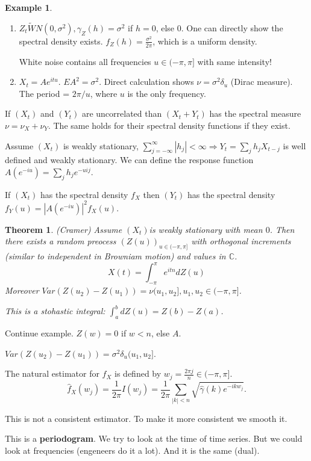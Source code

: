 \documentclass[12pt,a4paper]{amsart}
\theoremstyle{definition} %
\newtheorem{example}[defn]{Example}
\theoremstyle{plain} %
\newtheorem{theorem}[defn]{Theorem}
\newcommand{\C}{\mathbb C}
\begin{document}
\begin{example}
\begin{enumerate}
\item $Z_t \tilde WN(0, \sigma^2), \gamma_Z(h) = \sigma^2$ if $h = 0$, else $0$. One can directly show the spectral density exists. $f_Z(h) = \frac{\sigma^2}{2 \pi}$, which is a uniform density. 

White noise contains all frequencies $u \in (-\pi, \pi]$ with same intensity! 
\item $X_t = A e^{i t u}$. $E A^2 = \sigma^2$. Direct calculation shows $\nu = \sigma^2 \delta_u$ (Dirac measure). The period = $2 \pi / u$, where $u$ is the only frequency. 
\end{enumerate}
\vskip0.5cm

If $(X_t)$ and $(Y_t)$ are uncorrelated than  $(X_t + Y_t)$ has the spectral measure $\nu = \nu_X + \nu_Y$. The same holds for their spectral density functions if they exist. 

Assume $(X_t)$ is weakly stationary, $\sum_{j=-\infty}^\infty |h_j| < \infty \Rightarrow Y_t = \sum_j h_j X_{t-j}$ is well defined and weakly stationary. We can define the response function $A(e^{-iu}) = \sum_j h_j e^{-uij}$.

If $(X_t)$ has the spectral density $f_X$ then $(Y_t)$ has the spectral density $f_Y(u) = |A(e^{-iu})|^2 f_X(u)$. 

\begin{theorem} (Cramer)
Assume $(X_t)$is weakly stationary with mean $0$. Then there exists a random preocess $(Z(u))_{u \in(-\pi, \pi]}$ with orthogonal increments (similar to independent in Browniam motion) and values in $\C$. 
$$ X(t) = \int_{-\pi}^\pi e^{itn}dZ(u)$$
Moreover $Var(Z(u_2) - Z(u_1)) = \nu(u_1, u_2], u_1, u_2 \in (-\pi,\pi]$.

This is a stohastic integral:
$\int_a^bdZ(u) = Z(b) - Z(a)$.
\end{theorem}

Continue example.
$Z(w) = 0$ if $w < n$, else $A$. 

$Var(Z(u_2) - Z(u_1)) = \sigma^2 \delta_u(u_1, u_2]$.

The natural estimator for $f_X$ is defined by $w_j = \frac{2 \pi j}{n} \in (-\pi, \pi]$.
$$\hat{f}_X(w_j) =\frac{1}{2\pi} I(w_j)= \frac{1}{2\pi} \sum_{|k| < n} \sqrt{\hat{\gamma}(k)e^{-ikw_j}}.$$

This is not a consistent estimator. To make it more consistent we smooth it. 

This is a {\bf periodogram}. We try to look at the time of time series. But we could look at frequencies (engeneers do it a lot). And it is the same (dual). 
\end{example}
\end{document}

